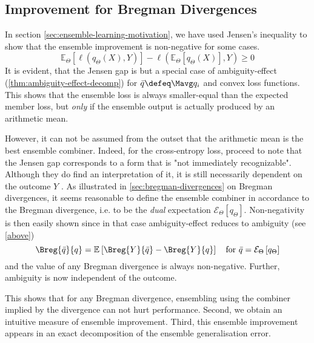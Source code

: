 \documentclass[../main.tex]{subfiles}
\begin{document}

\subsection{Improvement for Bregman Divergences}

In section \ref{sec:ensemble-learning-motivation}, we have used Jensen's inequality to show that the ensemble improvement is non-negative for some cases.
$$
\mathbb{E}_{{\Theta}}\left[ \ell (q_{\Theta}(X),Y) \right]  -
\ell(\mathbb{E}_{\Theta}\left[ q_{\Theta}(X) \right] ,Y ) \geq 0
$$
It is evident, that the Jensen gap is but a special case of ambiguity-effect (\ref{thm:ambiguity-effect-decomp}) for $\bar{q} \defeq \Mavg q_{i}$ and convex loss functions. 
This shows that the ensemble loss is always smaller-equal than the expected member loss, but \textit{only} if the ensemble output is actually produced by an arithmetic mean. 

However, it can not be assumed from the outset that the arithmetic mean is the best ensemble combiner. Indeed, for the cross-entropy loss, \citeauthor{abe} proceed to note that the Jensen gap corresponds to a form that is "not immediately recognizable". Although they do find an interpretation of it, it is still necessarily dependent on the outcome $Y$ 
.
As illustrated in \ref{sec:bregman-divergences} on Bregman divergences, 
it seems reasonable to define the ensemble combiner in accordance to the Bregman divergence, i.e. to be the \textit{dual} expectation $\mathcal{E}_{\Theta}\left[ q_{\Theta} \right]$. 
Non-negativity is then easily shown since in that case ambiguity-effect reduces to ambiguity (see \ref{above})
$$
\Breg{\bar{q}}{q} = \mathbb{E}_{}\left[ \Breg{Y}{\bar{q}} - \Breg{Y}{q} \right]
\hspace{1em} \text{for $\bar{q} = \mathcal{E}_\Theta\left[q_\Theta\right]$}
$$ and the value of any Bregman divergence is always non-negative. Further, ambiguity is now independent of the outcome.

This shows that for any Bregman divergence, ensembling using the combiner implied by the divergence can not hurt performance. Second, we obtain an intuitive measure of ensemble improvement. Third, this ensemble improvement appears in an exact decomposition of the ensemble generalisation error.
\end{document}
